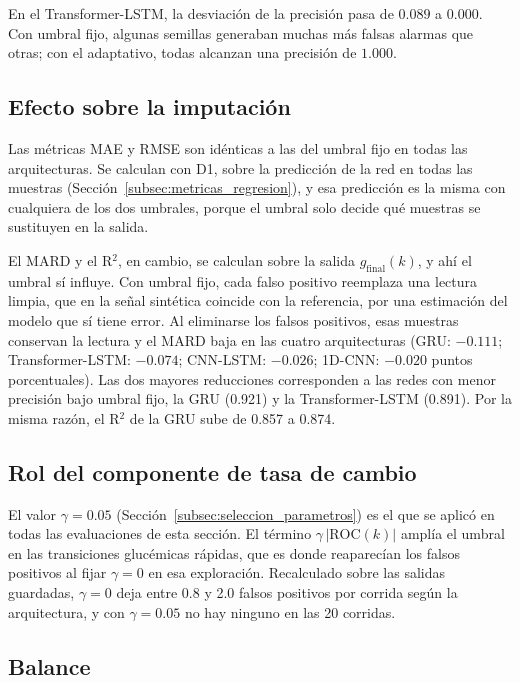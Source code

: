 \documentclass{report}
\begin{document}
En el Transformer-LSTM, la desviación de la precisión pasa de $0.089$ a $0.000$. Con umbral fijo, algunas semillas generaban muchas más falsas alarmas que otras; con el adaptativo, todas alcanzan una precisión de $1.000$.

\subsection*{Efecto sobre la imputación}

Las métricas MAE y RMSE son idénticas a las del umbral fijo en todas las arquitecturas. Se calculan con D1, sobre la predicción de la red en todas las muestras (Sección~\ref{subsec:metricas_regresion}), y esa predicción es la misma con cualquiera de los dos umbrales, porque el umbral solo decide qué muestras se sustituyen en la salida.

El MARD y el R$^2$, en cambio, se calculan sobre la salida $g_{\mathrm{final}}(k)$, y ahí el umbral sí influye. Con umbral fijo, cada falso positivo reemplaza una lectura limpia, que en la señal sintética coincide con la referencia, por una estimación del modelo que sí tiene error. Al eliminarse los falsos positivos, esas muestras conservan la lectura y el MARD baja en las cuatro arquitecturas (GRU: $-0.111$; Transformer-LSTM: $-0.074$; CNN-LSTM: $-0.026$; 1D-CNN: $-0.020$ puntos porcentuales). Las dos mayores reducciones corresponden a las redes con menor precisión bajo umbral fijo, la GRU (0.921) y la Transformer-LSTM (0.891). Por la misma razón, el R$^2$ de la GRU sube de 0.857 a 0.874.

\subsection*{Rol del componente de tasa de cambio}

El valor $\gamma = 0.05$ (Sección~\ref{subsec:seleccion_parametros}) es el que se aplicó en todas las evaluaciones de esta sección. El término $\gamma\,|\text{ROC}(k)|$ amplía el umbral en las transiciones glucémicas rápidas, que es donde reaparecían los falsos positivos al fijar $\gamma = 0$ en esa exploración. Recalculado sobre las salidas guardadas, $\gamma = 0$ deja entre 0.8 y 2.0 falsos positivos por corrida según la arquitectura, y con $\gamma = 0.05$ no hay ninguno en las 20 corridas.

\subsection*{Balance}
\end{document}
